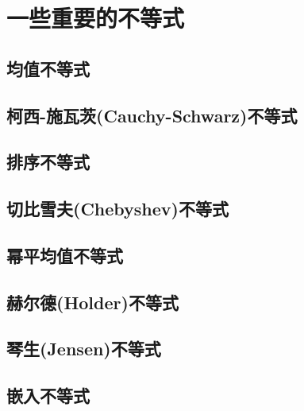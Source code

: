 
\section{一些重要的不等式}
\label{sec:some-important-inequation}

\subsection{均值不等式}

\subsection{柯西-施瓦茨(Cauchy-Schwarz)不等式}

\subsection{排序不等式}

\subsection{切比雪夫(Chebyshev)不等式}

\subsection{幂平均值不等式}

\subsection{赫尔德(Holder)不等式}

\subsection{琴生(Jensen)不等式}

\subsection{嵌入不等式}

